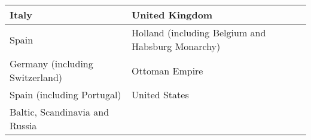 \begin{tabular}{|l|l|}
\hline
Italy    & United Kingdom        \\ \hline  
Spain   &                 Holland (including Belgium and Habsburg Monarchy)   \\ \hline     
 Germany (including Switzerland) & Ottoman Empire                 \\ \hline    
Spain (including Portugal) & United States \\ \hline 
Baltic, Scandinavia and Russia \\ \hline
\end{tabular}

